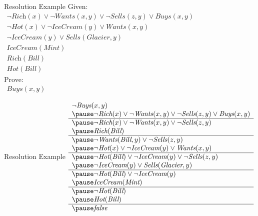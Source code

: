 \documentclass[14pt]{beamer}
\begin{document}
\begin{frame}{Resolution Example}
	Given:
	\\[.5em]
	$
	\begin{array}{l}
		\lnot\textit{Rich}(x) \lor \lnot\textit{Wants}(x, y) \lor \lnot\textit{Sells}(z, y) \lor \textit{Buys}(x, y) \\
		\lnot\textit{Hot}(x) \lor \lnot\textit{IceCream}(y) \lor \textit{Wants}(x, y) \\
		\lnot\textit{IceCream}(y) \lor \textit{Sells}(\textit{Glacier}, y) \\
		\textit{IceCream}(\textit{Mint}) \\
		\textit{Rich}(\textit{Bill}) \\
		\textit{Hot}(\textit{Bill})
	\end{array}
	$
	\\[1em]
	Prove:
	\\[.5em]
	$
	\begin{array}{l}
		\textit{Buys}(x, y)
	\end{array}
	$
\end{frame}
\begin{frame}{Resolution Example}
	$
	\begin{array}{l}
		\lnot\textit{Buys}(x, y) \\
		\pause
		\lnot\textit{Rich}(x) \lor \lnot\textit{Wants}(x, y) \lor \lnot\textit{Sells}(z, y) \lor \textit{Buys}(x, y) \\
		\hline
		\pause
		\lnot\textit{Rich}(x) \lor \lnot\textit{Wants}(x, y) \lor \lnot\textit{Sells}(z, y)	\\
		\pause
		\textit{Rich}(\textit{Bill}) \\
		\hline
		\pause
		\lnot\textit{Wants}(\textit{Bill}, y) \lor \lnot\textit{Sells}(z, y) \\
		\pause
		\lnot\textit{Hot}(x) \lor \lnot\textit{IceCream}(y) \lor \textit{Wants}(x, y) \\
		\hline
		\pause
		\lnot\textit{Hot}(\textit{Bill}) \lor \lnot\textit{IceCream}(y) \lor \lnot\textit{Sells}(z, y) \\
		\pause
		\lnot\textit{IceCream}(y) \lor \textit{Sells}(\textit{Glacier}, y) \\
		\hline
		\pause
		\lnot\textit{Hot}(\textit{Bill}) \lor \lnot\textit{IceCream}(y) \\
		\pause
		\textit{IceCream}(\textit{Mint}) \\
		\hline
		\pause
		\lnot\textit{Hot}(\textit{Bill}) \\
		\pause
		\textit{Hot}(\textit{Bill}) \\
		\hline
		\pause
		\textit{false}
	\end{array}
	$
\end{frame}
\end{document}

